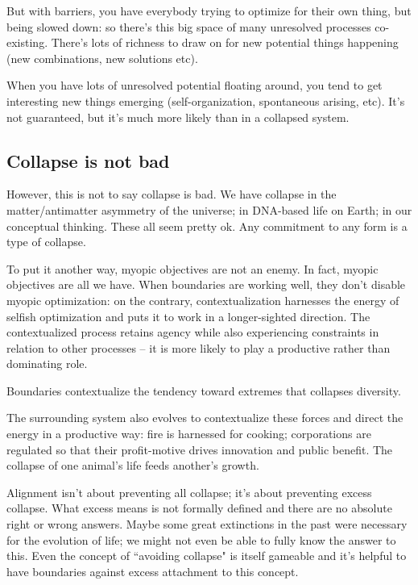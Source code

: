 But with barriers, you have everybody trying to optimize for their own thing, but being slowed down: so there's this big space of many unresolved processes co-existing. There's lots of richness to draw on for new potential things happening (new combinations, new solutions etc). 

When you have lots of unresolved potential floating around, you tend to get interesting new things emerging (self-organization, spontaneous arising, etc). It's not guaranteed, but it's much more likely than in a collapsed system.


\subsection{Collapse is not bad}

However, this is not to say collapse is bad. We have collapse in the matter/antimatter asymmetry of the universe; in DNA-based life on Earth; in our conceptual thinking. These all seem pretty ok. Any commitment to any form is a type of collapse. 

To put it another way, myopic objectives are not an enemy. In fact, myopic objectives are all we have. When boundaries are working well, they don't disable myopic optimization: on the contrary, contextualization harnesses the energy of selfish optimization and puts it to work in a longer-sighted direction. The contextualized process retains agency while also experiencing constraints in relation to other processes -- it is more likely to play a productive rather than dominating role.  

Boundaries contextualize the tendency toward extremes that collapses diversity. 

The surrounding system also evolves to contextualize these forces and direct the energy in a productive way: fire is harnessed for cooking; corporations are regulated so that their profit-motive drives innovation and public benefit. The collapse of one animal’s life feeds another’s growth.

Alignment isn't about preventing all collapse; it's about preventing excess collapse. What excess means is not formally defined and there are no absolute right or wrong answers. Maybe some great extinctions in the past were necessary for the evolution of life; we might not even be able to fully know the answer to this. Even the concept of ``avoiding collapse" is itself gameable and it's helpful to have boundaries against excess attachment to this concept.

